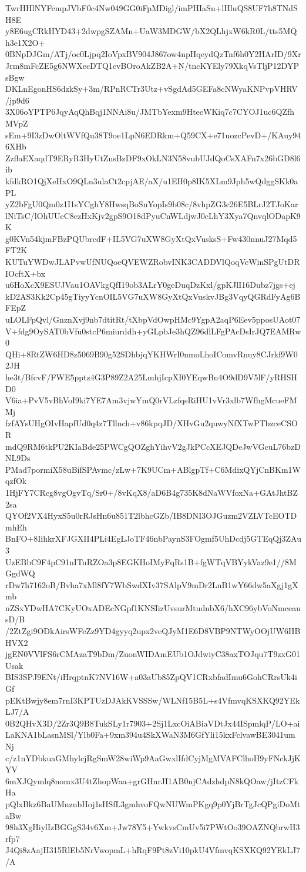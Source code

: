 TwrHHlNYFcmpJVbF0c4Nw049GG0iFpMDigl/imPHIaSn+lHluQS8UF7h8TNdSH8E
y8E6ugCRkHYD43+2dwpgSZAMn+UaW3MDGW/bX2QLhjxW6kR0L/tts5MQh3e1X2O+
0BNpDJGm/ATj/oc0Ljpq2IoVpxBV904J867ow4npHqeydQzTnf6h0Y2HArID/9Xr
Jrm8mFcZE5g6NWXecDTQ1cvBOroAkZB2A+N/tncKYEly79XkqVsTljP12DYPsBgw
DKLnEgonHS6dzkSy+3m/RPnRCTr3Utz+vSgdAd5GEFa8cNWyaKNPvpVHRV/jp9d6
3X06oYPTP6JqyAqQhBqj1NNAi8u/JMTbYexm9HtecWKiq7c7CYOJ1uc6QZfhMVpZ
sEm+9I3zDwOltWVfQu38T9oe1LpN6EDRkm+Q59CX+e71uozcPevD+/KAuy946XHb
ZzflaEXaqdT9ERyR3HyUtZnsBzDF9xOkLN3N58vubUJdQoCsXAFn7x26bGD8l6ib
kfdkRO1QjXeHxO9QLn3ulaCt2cpjAE/aX/u1EH0p8IK5XLm9Jph5wQdggSKk0aPL
yZ2bFgU0Qm0z1I1sYCghY8HwsqBoSnYopIs9b08c/8vhpZG3c26E5BLrJ2TJoKar
lNiTsC/lOhUUeC8czHxKjv2gpS9O18dPyuCnWLdjwJ0cLhY3Xya7QnvqlODapK9K
g0KVn54kjmFBzPQUbrcdF+IL5VG7uXW8GyXtQxVusksS+Fw430nnuJ27Mqd5FT2K
KUTuYWDwJLAPvwUfNUQoeQVEWZRobvINK3CADDVlQoqVeWinSPgUtDRIOcftX+bx
u6HoXcX9ESUJVau1OAVkgQfI19ob3ALrY0geDuqDzKxl/gpKJlI16Dubz7jgs+ej
kD2AS3Kk2Cp45gTiyyYcnOIL5VG7uXW8GyXtQxVuskvJBg3VqyQGRdFyAg6BFEpZ
uLOLFpQvl/GnznXvj9nb7dtitRt/tXbpVdOwpHMc9YgpA2aqP6Eev5pposUAot07
V+fdg9OySAT0bVfu0stcP6miurddh+yGLpbJe3hQZ96dlLFgPAcDsIrJQ7EAMRw0
QHi+8RtZW6HD8z5069B90g52SDhbjqYKHWrI0nmoLhoIComvRnuy8CJrkf9W02JH
he3t/BfcvF/FWE5pptz4G3P89Z2A25LmhjIcpXI0YEqwBn4O9dD9V5lF/yRHSHD0
V6ia+PvV5vBhVoI9ki7YE7Am3vjwYmQ0rVLzfqsRiHU1vVr3xlb7WfhgMcueFMMj
fzfAYsUHgOIvHapfUd0q4z7Tllnch+v86kpqJD/XHvGu2quwyNfXTwPTbzceCSOR
mdQ9RM6tkPU2KIaBde25PWCgQOZghYihvV2gJkPCcXEJQDeJwVGcuL76bzDNL9Ds
PMad7pormiX58uBifSPAvmc/zLw+7K9UCm+ABlgpTf+C6MdixQYjCnBKm1WqzfOk
1HjFY7CRcg8vgOgvTq/Sr0+/8vKqX8/aD6B4g735K8dNaWVfoxNa+GAtJhtBZ2sa
QYOf2VX4HyxS5u0rRJsHn6u851T2lbhcGZb/IB8DNI3OJGuzm2VZLVTcEOTDmhEh
BnFO+8IihkrXFJGXII4PLi4EgLJoTF46nbPaynS3FOgmf5UhDcdj5GTEqQj3ZAu3
UzEBbC9F4pC91nITnRZOa3p8EGKHoIMyFqRs1B+fgWTqVBYykVaz9e1//8MGgdWQ
rDw7h7162oB/Bvha7xMl8fY7WbSwdXIv37SAlpV9mDr2LnB1wY66dw5aXgj1gXmb
nZSxYDwHA7CKyUOxADEcNGpf1KNSIizUvsurMtudnbX6/hXC96ybVoNmceausD/B
/2ZtZgi9ODkAirsWFeZz9YD4gyyq2upx2veQJyM1E6D8VBP9NTWyOOjUW6HBHVX2
jgEN0VVlFS6rCMAzaT9bDm/ZuonWIDAmEUb1OJdwiyC38axTOJqu7T9zxG01Usak
BIS3SPJ9ENt/iHrqptnK7NV16W+a03aUb85ZpQV1CRxbfadImu6GohCRrsUk4iGf
pEKtBwjy8em7rnI3KPTUzDJAkKVSSSw/WLNf15B5L+s4VfmvqKSXKQ92YEkLJ7/A
0B2QHvX3D/2Zr3Q9B8TukSLy1r7903+2Sj1LxcOiABiaVDtJx44ISpmlqP/LO+ai
LaKNA1bLasnMSl/Ylb0Fa+9xm394u4SkXWaN3M6GfYli15kxFclvawBE3041umNj
c/z1nYDbkuaGMhylcjRgSmW28wiWp9AaGwxlIfdCyjMgMVAFClhoH9yFNckJjKYV
6mXJQymlq8nomx3U4tZhopWaa+grGHnrJI1AB0njCAdzhdpN8kQOaw/jItzCFkHa
pQlxBkz6BaUMnzubHoj1sHSfL3gmhvoFQwNUWmPKgq9p0YjBrTgJcQPgiDoMtaBw
98h3XgHiylIzBGGgS34v6Xm+Jw78Y5+YwkvsCmUv5i7PWtOo39OAZNQbrwH3rfp7
J4Qi8zAajH315RlEb5NrVwopmL+hRqF9Pt8zVi10pkU4VfmvqKSXKQ92YEkLJ7/A
